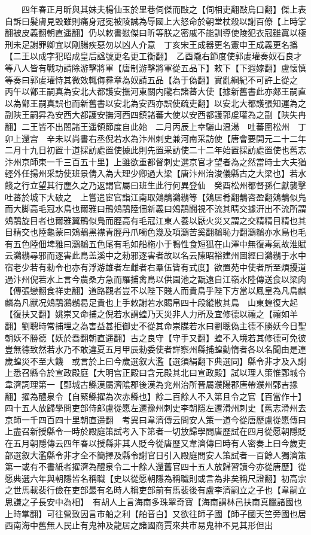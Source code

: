 　　四年春正月昕與其妹夫楊仙玉於里巷伺傑而敺之【伺相吏翻敺烏口翻】傑上表自訴曰髪膚見毁雖則痛身冠冕被陵誠為辱國上大怒命於朝堂杖殺以謝百僚【上時掌翻被皮義翻朝直遥翻】仍以敕書慰傑曰昕等朕之密戚不能訓導使陵犯衣冠雖寘以極刑未足謝罪卿宜以剛腸疾惡勿以凶人介意　丁亥宋王成器更名憲申王成義更名撝【二王以成字犯昭成皇后諡號更名更工衡翻】　乙酉隴右節度使郭䖍瓘奏奴石良才等八人皆有戰功請除游擊將軍【唐制游擊將軍從五品下】敕下【下遐嫁翻】盧懷慎等奏曰郭䖍瓘恃其微效輒侮彛章為奴請五品【為于偽翻】實亂綱紀不可許上從之　丙午以鄫王嗣真為安北大都護安撫河東關内隴右諸蕃大使【據新舊書此亦郯王嗣直以為鄫王嗣真誤也而新舊書以安北為安西亦誤使疏吏翻】以安北大都護張知運為之副陜王嗣昇為安西大都護安撫河西四鎮諸蕃大使以安西都護郭䖍瓘為之副【陜失冉翻】二王皆不出閤諸王遥領節度自此始　二月丙辰上幸驪山温湯　吐蕃圍松州　丁卯上還宫　辛未以尚書右丞倪若水為汴州刺史兼河南采訪使【唐會要開元二十二年二月十九日初置十道採訪處置使據此則先置采訪使二十二年始置採訪處置使也舊志汴州京師東一千三百五十里】上雖欲重都督刺史選京官才望者為之然當時士大夫猶輕外任揚州采訪使班景倩入為大理少卿過大梁【唐汴州治浚儀縣古之大梁也】若水餞之行立望其行塵久之乃返謂官屬曰班生此行何異登仙　癸酉松州都督孫仁獻襲擊吐蕃於城下大破之　上嘗遣宦官詣江南取鵁鶄鸂䳵等【鵁居肴翻鶄咨盈翻鵁鶄似鳬而大脚高毛冠水鳥也爾雅曰鳽鵁鶄陸佃新義曰鵁鶄闘視不流其睛交據汧出不流所謂鵁鶄旋目者也爾雅翼鳽似鳬而脛高有毛冠江東人養以厭火災又謂之交精精目精也其目精交也陸龜蒙曰鵁鶄黑襟青脛丹爪噣色幾及項鸂苦奚翻䳵恥力翻鸂䳵亦水鳥也毛有五色陸佃埤雅曰鸂䳵五色尾有毛如船柂小于鴨性食短狐在山澤中無復毒氣故淮賦云鸂䳵尋邪而逐害此鳥盖溪中之勑邪逐害者故以名云陳昭裕建州圖經曰鸂䳵于水中宿老少若有勑令也亦有浮游雄者左雌者右羣伍皆有式度】欲置苑中使者所至煩擾道過汴州倪若水上言今農桑方急而羅捕禽鳥以供園池之翫遠自江嶺水陸傳送食以梁肉【傳張戀翻食祥吏翻】道路觀者豈不以陛下賤人而貴鳥乎陛下方當以鳳皇為凡鳥麒麟為凡獸况鵁鶄鸂䳵曷足貴也上手敕謝若水賜帛四十段縱散其鳥　山東蝗復大起【復扶又翻】姚崇又命捕之倪若水謂蝗乃天災非人力所及宜修德以禳之【禳如羊翻】劉聰時常捕埋之為害益甚拒御史不從其命崇牒若水曰劉聰偽主德不勝妖今日聖朝妖不勝德【妖於喬翻朝直遥翻】古之良守【守手又翻】蝗不入境若其修德可免彼豈無德致然若水乃不敢違夏五月甲辰勑委使者詳察州縣捕蝗勤惰者各以名聞由是連歲蝗災不至大饑　或言於上曰今歲選叙大濫【選須絹翻下典選同】縣令非才及入謝上悉召縣令於宣政殿庭【大明宫正殿曰含元殿其北曰宣政殿】試以理人策惟鄄城令韋濟詞理第一【鄄城古縣漢屬濟隂郡後漢為兖州治所晉屬濮陽郡唐帶濮州鄄吉掾翻】擢為醴泉令【自緊縣擢為次赤縣也】餘二百餘人不入第且令之官【百當作十】四十五人放歸學問吏部侍郎盧從愿左遷豫州刺史李朝隱左遷滑州刺史【舊志滑州去京師一千四百四十里朝直遥翻　考異曰韋濟傳云問安人策一道今從唐歷盧從愿傳曰上盡召新授縣令一時於殿庭策試考入下第者一切放歸學問唐歷試在四月從愿朝隱貶在五月朝隱傳云四年春以授縣非其人貶今從唐歷又韋濟傳曰時有人密奏上曰今歲吏部選叙大濫縣令非才全不簡擇及縣令謝官日引入殿庭問安人策試者一百餘人獨濟策第一或有不書紙者擢濟為醴泉令二十餘人還舊官四十五人放歸習讀今亦從唐歷】從愿典選六年與朝隱皆名稱職【史以從愿朝隱為稱職則或言為非矣稱尺證翻】初高宗之世馬載裴行儉在吏部最有名時人稱吏部前有馬裴後有盧李濟嗣立之子也【韋嗣立思謙之子長安中為相】　有胡人上言海南多珠翠奇寶【海南謂林邑扶南真臘諸國也上時掌翻】可往營致因言市舶之利【舶音白】又欲往師子國【師子國天竺旁國也居西南海中舊無人民止有鬼神及龍居之諸國商賈來共市易鬼神不見其形但出